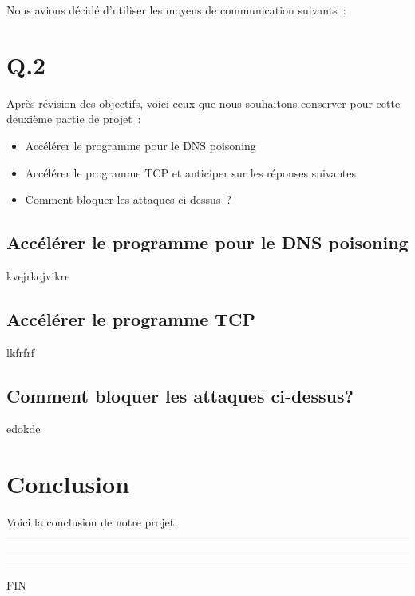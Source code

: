 \documentclass[a4paper, 12pt,twoside]{article}
\begin{document}
            Nous avions décidé d'utiliser les moyens de communication suivants~:
           

    \clearpage
    \section{Q.2}

        Après révision des objectifs, voici ceux que nous souhaitons conserver pour cette deuxième partie de projet~:

        \begin{itemize}[label=\color{bleu303}\textbullet{}]
            \item Accélérer le programme pour le DNS poisoning
            \item Accélérer le programme TCP et anticiper sur les réponses suivantes
            \item Comment bloquer les attaques ci-dessus~?
        \end{itemize}

        \subsection{Accélérer le programme pour le DNS poisoning}

            kvejrkojvikre

        \subsection{Accélérer le programme TCP}%

            lkfrfrf

        \subsection{Comment bloquer les attaques ci-dessus?}

            edokde

    \clearpage
    \section{Conclusion}

        Voici la conclusion de notre projet.

    \begin{center}
        \color{bleu303}

        \rule{0.3\textwidth}{0.2mm}\vspace*{-3.5mm}

        \rule{0.5\textwidth}{0.6mm}\vspace*{-3.8mm}

        \rule{0.3\textwidth}{0.2mm}\vspace*{-1mm}

        \sffamily FIN
    \end{center}
    
\end{document}
